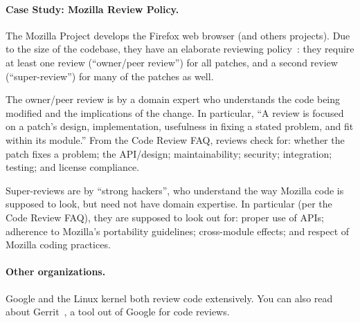 \paragraph{Case Study: Mozilla Review Policy.}
The Mozilla Project develops the Firefox web browser (and others
projects). Due to the size of the codebase, they have an elaborate
reviewing
policy~\cite{moz:sr, moz:cr}:
they require at least one review (``owner/peer review'') for all
patches, and a second review (``super-review'') for many of the
patches as well.

The owner/peer review is by a domain expert who understands the code
being modified and the implications of the change.  In particular, ``A
review is focused on a patch's design, implementation, usefulness in
fixing a stated problem, and fit within its module.''  From the Code
Review FAQ, reviews check for: whether the patch fixes a problem; the
API/design; maintainability; security; integration; testing; and
license compliance.

Super-reviews are by ``strong hackers'', who understand the way
Mozilla code is supposed to look, but need not have domain expertise.
In particular (per the Code Review FAQ), they are supposed to look out
for: proper use of APIs; adherence to Mozilla's portability
guidelines; cross-module effects; and respect of Mozilla coding
practices.

\paragraph{Other organizations.} Google and the Linux kernel both
review code extensively. You can also read about
Gerrit~\cite{gerrit}, a tool out of
Google for code reviews.




